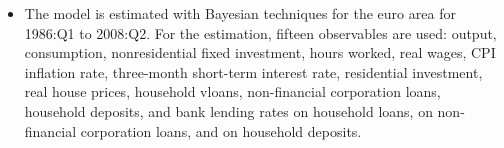 \documentclass[11pt,a4paper]{article}
\begin{document}
\begin{itemize}
		\item The model is estimated with Bayesian techniques for the euro area for 1986:Q1 to 2008:Q2. For the estimation, fifteen observables are used: output, consumption, nonresidential fixed investment, hours worked, real wages, CPI inflation rate, three-month short-term interest rate, residential investment, real house prices, household vloans, non-financial corporation loans, household deposits, and bank lending rates on household loans, on non-financial corporation loans, and on household deposits.
	\end{itemize}
	
	
\end{document}

